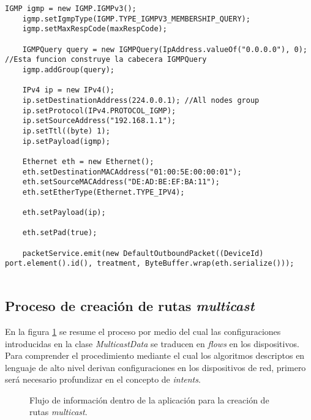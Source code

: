\begin{lstlisting}[caption={Fragmento en el que se construye un mensaje \textit{IGMP Query}}, captionpos=b, label={lst:query}]
    IGMP igmp = new IGMP.IGMPv3();
    igmp.setIgmpType(IGMP.TYPE_IGMPV3_MEMBERSHIP_QUERY);
    igmp.setMaxRespCode(maxRespCode);

    IGMPQuery query = new IGMPQuery(IpAddress.valueOf("0.0.0.0"), 0); //Esta funcion construye la cabecera IGMPQuery
    igmp.addGroup(query);

    IPv4 ip = new IPv4();
    ip.setDestinationAddress(224.0.0.1); //All nodes group
    ip.setProtocol(IPv4.PROTOCOL_IGMP);
    ip.setSourceAddress("192.168.1.1");
    ip.setTtl((byte) 1);
    ip.setPayload(igmp);

    Ethernet eth = new Ethernet();
    eth.setDestinationMACAddress("01:00:5E:00:00:01");
    eth.setSourceMACAddress("DE:AD:BE:EF:BA:11");
    eth.setEtherType(Ethernet.TYPE_IPV4);

    eth.setPayload(ip);

    eth.setPad(true);

    packetService.emit(new DefaultOutboundPacket((DeviceId) port.element().id(), treatment, ByteBuffer.wrap(eth.serialize()));
    
\end{lstlisting}


\subsection{Proceso de creación de rutas \textit{multicast}} \label{sec:creacion_rutas_multicast}

En la figura \ref{fig:createmcast} se resume el proceso por medio del cual las configuraciones introducidas en la clase \textit{MulticastData} se traducen en \textit{flows} en los dispositivos. Para comprender el procedimiento mediante el cual los algoritmos descriptos en lenguaje de alto nivel derivan configuraciones en los dispositivos de red, primero será necesario profundizar en el concepto de \textit{intents}. 

\begin{figure}[th]
	\centering 
	\caption[Flujo de creación de rutas \textit{multicast}]{Flujo de información dentro de la aplicación para la creación de rutas \textit{multicast}.}
	\label{fig:createmcast}
\end{figure}

